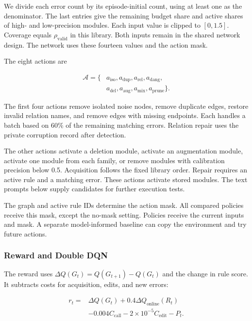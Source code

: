 We divide each error count by its episode-initial count, using at least
one as the denominator. The last entries give the remaining budget share
and active shares of high- and low-precision modules. Each input value
is clipped to $[0,1.5]$. Coverage equals $\rho_{\mathrm{valid}}$ in this
library. Both inputs remain in the shared network design. The network
uses these fourteen values and the action mask.

The eight actions are

\begin{equation}
\begin{split}
\mathcal A=\{&a_{\mathrm{iso}},a_{\mathrm{dup}},a_{\mathrm{rel}},a_{\mathrm{dang}},\\
&a_{\mathrm{del}},a_{\mathrm{aug}},a_{\mathrm{mix}},a_{\mathrm{prune}}\}.
\end{split}
\end{equation}

The first four actions remove isolated noise nodes, remove duplicate
edges, restore invalid relation names, and remove edges with missing
endpoints. Each handles a batch based on 60\% of the remaining matching
errors. Relation repair uses the private corruption record after detection.

The other actions activate a deletion module, activate an augmentation
module, activate one module from each family, or remove modules with
calibration precision below 0.5. Acquisition follows the fixed library
order. Repair requires an active rule and a matching error. These actions
activate stored modules. The text prompts below supply candidates for
further execution tests.

The graph and active rule IDs determine the action mask. All compared
policies receive this mask, except the no-mask setting. Policies receive
the current inputs and mask. A separate model-informed baseline can copy
the environment and try future actions.

\subsubsection{Reward and Double DQN}

The reward uses $\Delta Q(G_t)=Q(G_{t+1})-Q(G_t)$ and the change in rule
score. It subtracts costs for acquisition, edits, and new errors:

\begin{equation}
\label{eq:reward_def}
\begin{split}
r_t={}&\Delta Q(G_t)+0.4\Delta Q_{\mathrm{online}}(R_t)\\
&-0.004C_{\mathrm{call}}-2\times10^{-5}C_{\mathrm{edit}}-P_t.
\end{split}
\end{equation}

